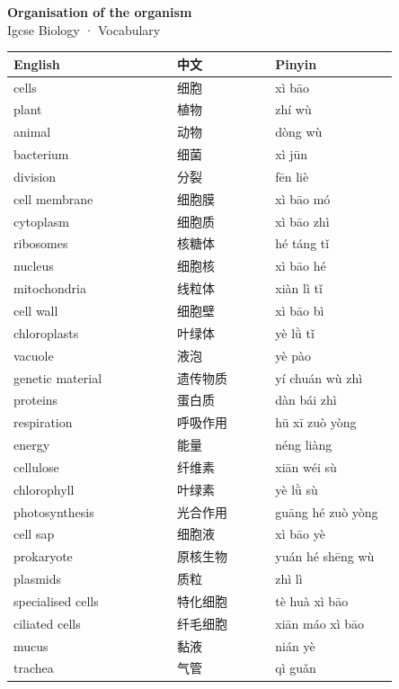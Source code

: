 \documentclass[11pt]{article}
\begin{document}
\begin{center}
  {\LARGE\bfseries Organisation of the organism}\\[0.35em]
  {\large Igcse Biology · Vocabulary}
\end{center}
\vspace{0.6em}

\begin{longtable}{@{}p{0.40\linewidth}p{0.24\linewidth}p{0.30\linewidth}@{}}
\toprule
\textbf{English} & \textbf{中文} & \textbf{Pinyin} \\
\midrule
\endhead
\bottomrule
\endlastfoot
cells & 细胞 & xì bāo \\
plant & 植物 & zhí wù \\
animal & 动物 & dòng wù \\
bacterium & 细菌 & xì jūn \\
division & 分裂 & fēn liè \\
cell membrane & 细胞膜 & xì bāo mó \\
cytoplasm & 细胞质 & xì bāo zhì \\
ribosomes & 核糖体 & hé táng tǐ \\
nucleus & 细胞核 & xì bāo hé \\
mitochondria & 线粒体 & xiàn lì tǐ \\
cell wall & 细胞壁 & xì bāo bì \\
chloroplasts & 叶绿体 & yè lǜ tǐ \\
vacuole & 液泡 & yè pào \\
genetic material & 遗传物质 & yí chuán wù zhì \\
proteins & 蛋白质 & dàn bái zhì \\
respiration & 呼吸作用 & hū xī zuò yòng \\
energy & 能量 & néng liàng \\
cellulose & 纤维素 & xiān wéi sù \\
chlorophyll & 叶绿素 & yè lǜ sù \\
photosynthesis & 光合作用 & guāng hé zuò yòng \\
cell sap & 细胞液 & xì bāo yè \\
prokaryote & 原核生物 & yuán hé shēng wù \\
plasmids & 质粒 & zhì lì \\
specialised cells & 特化细胞 & tè huà xì bāo \\
ciliated cells & 纤毛细胞 & xiān máo xì bāo \\
mucus & 黏液 & nián yè \\
trachea & 气管 & qì guǎn \\

\end{longtable}
\end{document}
